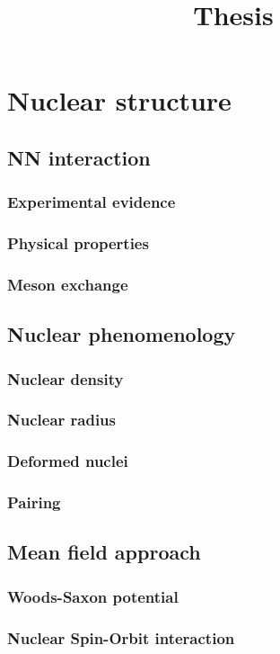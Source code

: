 \documentclass{book}
\title{Thesis}
\date{}
\begin{document}
\maketitle
\tableofcontents

\chapter{Nuclear structure}
\section{NN interaction}
\subsection{Experimental evidence}
\subsection{Physical properties}
\subsection{Meson exchange}
\section{Nuclear phenomenology}
\subsection{Nuclear density}
\subsection{Nuclear radius}
\subsection{Deformed nuclei}
\subsection{Pairing}
\section{Mean field approach}
\subsection{Woods-Saxon potential}
\subsection{Nuclear Spin-Orbit interaction}
\end{document}
